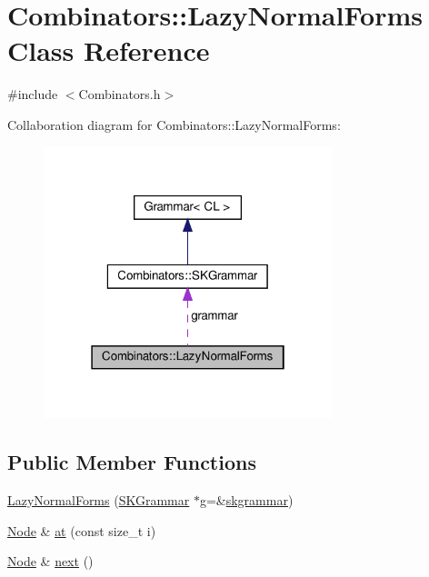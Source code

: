 \hypertarget{class_combinators_1_1_lazy_normal_forms}{}\section{Combinators\+:\+:Lazy\+Normal\+Forms Class Reference}
\label{class_combinators_1_1_lazy_normal_forms}


{\ttfamily \#include $<$Combinators.\+h$>$}



Collaboration diagram for Combinators\+:\+:Lazy\+Normal\+Forms\+:\nopagebreak
\begin{figure}[H]
\begin{center}
\leavevmode
\includegraphics[width=238pt]{class_combinators_1_1_lazy_normal_forms__coll__graph}
\end{center}
\end{figure}
\subsection*{Public Member Functions}
\begin{DoxyCompactItemize}
\item 
\hyperlink{class_combinators_1_1_lazy_normal_forms_ab3e10fd3a3d3611aaffbd11e6e6dd6f0}{Lazy\+Normal\+Forms} (\hyperlink{class_combinators_1_1_s_k_grammar}{S\+K\+Grammar} $\ast$g=\&\hyperlink{namespace_combinators_a24aeacfa083d06000a89cb59d14eeccb}{skgrammar})
\item 
\hyperlink{class_node}{Node} \& \hyperlink{class_combinators_1_1_lazy_normal_forms_a6cd27fdb59899d435c5114288b614067}{at} (const size\+\_\+t i)
\item 
\hyperlink{class_node}{Node} \& \hyperlink{class_combinators_1_1_lazy_normal_forms_a7a95278f40ba41d7148be0d55d46baa4}{next} ()
\end{DoxyCompactItemize}
